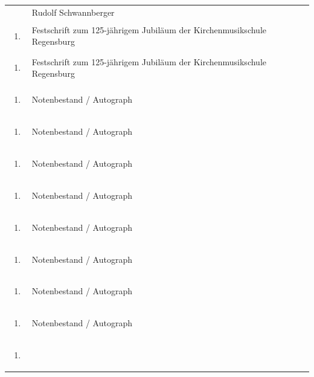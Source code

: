 \documentclass[a4paper]{article}
\begin{document}
\begin{flushleft}
\begin{supertabular}{m{1.2409999cm}m{14.604cm}}
 &
Rudolf Schwannberger\\
\begin{enumerate}
\item
\end{enumerate}
 &
Festschrift zum 125-jährigem Jubiläum der Kirchenmusikschule
Regensburg\\
\begin{enumerate}
\item
\end{enumerate}
 &
Festschrift zum 125-jährigem Jubiläum der Kirchenmusikschule
Regensburg\\
\begin{enumerate}
\item
\end{enumerate}
 &
Notenbestand / Autograph\\
\begin{enumerate}
\item
\end{enumerate}
 &
Notenbestand / Autograph\\
\begin{enumerate}
\item
\end{enumerate}
 &
Notenbestand / Autograph\\
\begin{enumerate}
\item
\end{enumerate}
 &
Notenbestand / Autograph\\
\begin{enumerate}
\item
\end{enumerate}
 &
Notenbestand / Autograph\\
\begin{enumerate}
\item
\end{enumerate}
 &
Notenbestand / Autograph\\
\begin{enumerate}
\item
\end{enumerate}
 &
Notenbestand / Autograph\\
\begin{enumerate}
\item
\end{enumerate}
 &
Notenbestand / Autograph\\
\begin{enumerate}
\item
\end{enumerate}

\end{supertabular}
\end{flushleft}
\end{document}
